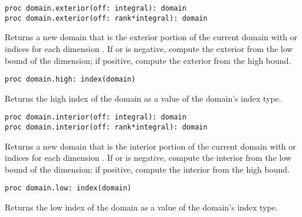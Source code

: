 \begin{protohead}
\begin{verbatim}
proc domain.exterior(off: integral): domain
proc domain.exterior(off: rank*integral): domain
\end{verbatim}
\end{protohead}
\begin{protobody}
Returns a new domain that is the exterior portion of the current
domain with  or  indices for each
dimension .  If  or  is negative,
compute the exterior from the low bound of the dimension; if positive,
compute the exterior from the high bound.
\end{protobody}

\begin{protohead}
\begin{verbatim}
proc domain.high: index(domain)
\end{verbatim}
\end{protohead}
\begin{protobody}
Returns the high index of the domain as a value of the domain's index
type.
\end{protobody}

\begin{protohead}
\begin{verbatim}
proc domain.interior(off: integral): domain
proc domain.interior(off: rank*integral): domain
\end{verbatim}
\end{protohead}
\begin{protobody}
Returns a new domain that is the interior portion of the current
domain with  or  indices for each
dimension .  If  or  is negative,
compute the interior from the low bound of the dimension; if positive,
compute the interior from the high bound.
\end{protobody}

\begin{protohead}
\begin{verbatim}
proc domain.low: index(domain)
\end{verbatim}
\end{protohead}
\begin{protobody}
Returns the low index of the domain as a value of the domain's index
type.
\end{protobody}

